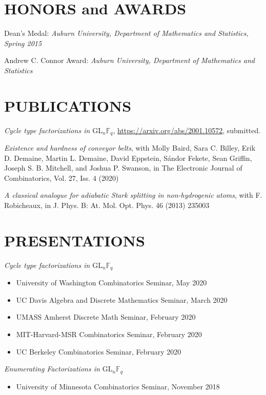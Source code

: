 \documentclass{res}
\begin{document}
\begin{resume}
\section{HONORS and AWARDS}
	\vspace{2mm}

Dean's Medal: \textit{Auburn University, Department of Mathematics and Statistics, Spring 2015}

Andrew C. Connor Award: \textit{Auburn University, Department of Mathematics and Statistics}

\section{PUBLICATIONS}
  \vspace{2mm}

{\it Cycle type factorizations in \(\mathrm{GL}_n \mathbb{F}_q\)},
\url{https://arxiv.org/abs/2001.10572},
submitted.

{\it Existence and hardness of conveyor belts},
with Molly Baird, Sara C. Billey, Erik D. Demaine, Martin L. Demaine, David Eppstein, S\'andor Fekete, Sean Griffin, Joseph S. B. Mitchell, and Joshua P. Swanson, in The Electronic Journal of Combinatorics, Vol. 27, Iss. 4 (2020)

{\it A classical analogue for adiabatic Stark splitting in non-hydrogenic atoms},
with F. Robicheaux, in
J. Phys. B: At. Mol. Opt. Phys. 46 (2013) 235003

\section{PRESENTATIONS}
  \vspace{2mm}
{\it Cycle type factorizations in \(\mathrm{GL}_n \mathbb{F}_q\)}
\begin{itemize}
\item University of Washington Combinatorics Seminar, May 2020
\item UC Davis Algebra and Discrete Mathematics Seminar, March 2020
\item UMASS Amherst Discrete Math Seminar, February 2020
\item MIT-Harvard-MSR Combinatorics Seminar, February 2020
\item UC Berkeley Combinatorics Seminar, February 2020
\end{itemize}

{\it Enumerating Factorizations in \(\mathrm{GL}_n \mathbb{F}_q\)}
\begin{itemize}
\item University of Minnesota Combinatorics Seminar, November 2018
\end{itemize}


\end{resume}
\end{document}
